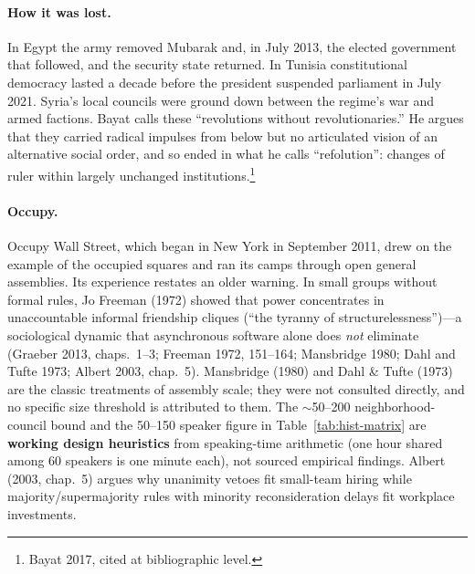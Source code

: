 \documentclass[10pt,twoside,openany]{book}
\theoremstyle{dpepstyle}
\begin{document}
\paragraph{How it was lost.} In Egypt the army removed Mubarak and, in July 2013, the elected government that followed, and the security state returned. In Tunisia constitutional democracy lasted a decade before the president suspended parliament in July 2021. Syria's local councils were ground down between the regime's war and armed factions. Bayat calls these ``revolutions without revolutionaries.'' He argues that they carried radical impulses from below but no articulated vision of an alternative social order, and so ended in what he calls ``refolution'': changes of ruler within largely unchanged institutions.\footnote{Bayat 2017, cited at bibliographic level.}

\paragraph{Occupy.} Occupy Wall Street, which began in New York in September 2011, drew on the example of the occupied squares and ran its camps through open general assemblies. Its experience restates an older warning. In small groups without formal rules, Jo Freeman (1972) showed that power concentrates in unaccountable informal friendship cliques (``the tyranny of structurelessness'')---a sociological dynamic that asynchronous software alone does \emph{not} eliminate (Graeber 2013, chaps.~1--3; Freeman 1972, 151--164; Mansbridge 1980; Dahl and Tufte 1973; Albert 2003, chap.~5). Mansbridge (1980) and Dahl \& Tufte (1973) are the classic treatments of assembly scale; they were not consulted directly, and no specific size threshold is attributed to them. The $\sim$50--200 neighborhood-council bound and the 50--150 speaker figure in Table~\ref{tab:hist-matrix} are \textbf{working design heuristics} from speaking-time arithmetic (one hour shared among 60 speakers is one minute each), not sourced empirical findings. Albert (2003, chap.~5) argues why unanimity vetoes fit small-team hiring while majority/supermajority rules with minority reconsideration delays fit workplace investments.
\end{document}
